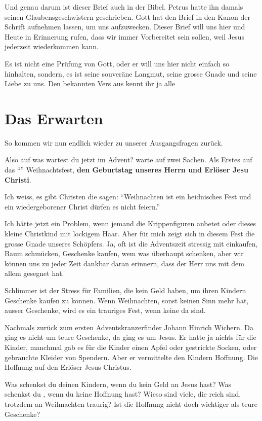 \documentclass[fontsize=16pt]{mybib}
\begin{document}
Und genau darum ist dieser Brief auch in der Bibel. Petrus hatte ihn damals seinen Glaubensgeschwistern geschrieben. Gott hat den Brief in den Kanon der Schrift aufnehmen lassen, um uns aufzuwecken. Dieser Brief will uns hier und Heute in Erinnerung rufen, dass wir immer Vorbereitet sein sollen, weil Jesus jederzeit wiederkommen kann.

Es ist nicht eine Prüfung von Gott, oder er will uns hier nicht einfach so hinhalten, sondern, es ist seine souveräne Langmut, seine grosse Gnade und seine Liebe zu uns. Den bekannten Vers aus  kennt ihr ja alle

\section{Das Erwarten}
So kommen wir nun endlich wieder zu unserer Ausgangsfragen zurück.

Also auf was wartest du jetzt im Advent?  warte auf zwei Sachen. Als Erstes auf das \enquote{} Weihnachtsfest, \textbf{den Geburtstag unseres Herrn und Erlöser Jesu Christi}.

Ich weiss, es gibt Christen die sagen: \enquote{Weihnachten ist ein heidnisches Fest und ein wiedergeborener Christ dürfen es nicht feiern.}

Ich hätte jetzt ein Problem, wenn jemand die Krippenfiguren anbetet oder dieses kleine Christkind mit lockigem Haar. Aber für mich zeigt sich in diesem Fest die grosse Gnade unseres Schöpfers. Ja, oft ist die Adventszeit stressig mit einkaufen, Baum schmücken, Geschenke kaufen, wem was überhaupt schenken, aber wir können uns zu jeder Zeit dankbar daran erinnern, dass der Herr uns mit dem allem gesegnet hat.

Schlimmer ist der Stress für Familien, die kein Geld haben, um ihren Kindern Geschenke kaufen zu können. Wenn Weihnachten, sonst keinen Sinn mehr hat, ausser Geschenke, wird es ein trauriges Fest, wenn keine da sind.

Nachmals zurück zum ersten Adventskranzerfinder Johann Hinrich Wichern. Da ging es nicht um teure Geschenke, da ging es um Jesus. Er hatte ja nichts für die Kinder, manchmal gab es für die Kinder einen Apfel oder gestrickte Socken, oder gebrauchte Kleider von Spendern. Aber er vermittelte den Kindern Hoffnung. Die Hoffnung auf den Erlöser Jesus Christus.

Was schenkst du deinen Kindern, wenn du kein Geld  an Jesus hast? Was schenkst du , wenn du keine Hoffnung hast? Wieso sind viele, die reich sind, trotzdem an Weihnachten traurig? Ist die Hoffnung nicht doch wichtiger als teure Geschenke?
\end{document}
